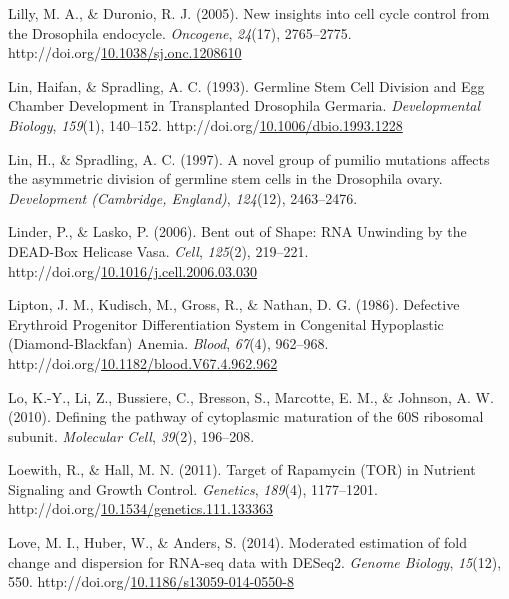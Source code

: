 \documentclass[12pt,oneside]{reedthesis}
\newlength{\cslhangindent}
\newenvironment{CSLReferences}[2] %
 {%
  \setlength{\parindent}{0pt}
  \ifodd #1 \everypar{\setlength{\hangindent}{\cslhangindent}}\ignorespaces\fi
  \ifnum #2 > 0
  \setlength{\parskip}{#2\baselineskip}
  \fi
 }%
 {}
\begin{document}
\begin{CSLReferences}{1}{0}
\leavevmode{}%
Lilly, M. A., \& Duronio, R. J. (2005). New insights into cell cycle control from the {Drosophila} endocycle. \emph{Oncogene}, \emph{24}(17), 2765--2775. http://doi.org/\href{https://doi.org/10.1038/sj.onc.1208610}{10.1038/sj.onc.1208610}

\leavevmode{}%
Lin, Haifan, \& Spradling, A. C. (1993). Germline {Stem Cell Division} and {Egg Chamber Development} in {Transplanted Drosophila Germaria}. \emph{Developmental Biology}, \emph{159}(1), 140--152. http://doi.org/\href{https://doi.org/10.1006/dbio.1993.1228}{10.1006/dbio.1993.1228}

\leavevmode{}%
Lin, H., \& Spradling, A. C. (1997). A novel group of pumilio mutations affects the asymmetric division of germline stem cells in the {Drosophila} ovary. \emph{Development (Cambridge, England)}, \emph{124}(12), 2463--2476.

\leavevmode{}%
Linder, P., \& Lasko, P. (2006). Bent out of {Shape}: {RNA Unwinding} by the {DEAD-Box Helicase Vasa}. \emph{Cell}, \emph{125}(2), 219--221. http://doi.org/\href{https://doi.org/10.1016/j.cell.2006.03.030}{10.1016/j.cell.2006.03.030}

\leavevmode{}%
Lipton, J. M., Kudisch, M., Gross, R., \& Nathan, D. G. (1986). Defective {Erythroid Progenitor Differentiation System} in {Congenital Hypoplastic} ({Diamond-Blackfan}) {Anemia}. \emph{Blood}, \emph{67}(4), 962--968. http://doi.org/\href{https://doi.org/10.1182/blood.V67.4.962.962}{10.1182/blood.V67.4.962.962}

\leavevmode{}%
Lo, K.-Y., Li, Z., Bussiere, C., Bresson, S., Marcotte, E. M., \& Johnson, A. W. (2010). Defining the pathway of cytoplasmic maturation of the {60S} ribosomal subunit. \emph{Molecular Cell}, \emph{39}(2), 196--208.

\leavevmode{}%
Loewith, R., \& Hall, M. N. (2011). Target of {Rapamycin} ({TOR}) in {Nutrient Signaling} and {Growth Control}. \emph{Genetics}, \emph{189}(4), 1177--1201. http://doi.org/\href{https://doi.org/10.1534/genetics.111.133363}{10.1534/genetics.111.133363}

\leavevmode{}%
Love, M. I., Huber, W., \& Anders, S. (2014). Moderated estimation of fold change and dispersion for {RNA-seq} data with {DESeq2}. \emph{Genome Biology}, \emph{15}(12), 550. http://doi.org/\href{https://doi.org/10.1186/s13059-014-0550-8}{10.1186/s13059-014-0550-8}


\end{CSLReferences}
\end{document}
